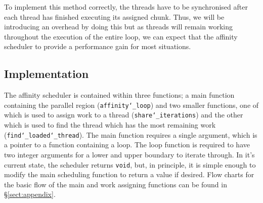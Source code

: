 \documentclass[11pt, a4paper]{article}
\begin{document}
			To implement this method correctly, the threads have to be synchronised after each thread has finished executing its assigned chunk. Thus, we will be introducing an overhead by doing this but as threads will remain working throughout the execution of the entire loop, we can expect that the affinity scheduler to provide a performance gain for most situations.	
			
		\subsection{Implementation}
			The affinity scheduler is contained within three functions; a main function containing the parallel region (\texttt{affinity\char`_loop}) and two smaller functions, one of which is used to assign work to a thread (\texttt{share\char`_iterations}) and the other which is used to find the thread which has the most remaining work (\texttt{find\char`_loaded\char`_thread}). The main function requires a single argument, which is a pointer to a function containing a loop. The loop function is required to have two integer arguments for a lower and upper boundary to iterate through. %
			In it's current state, the scheduler returns \texttt{void}, but, in principle, it is simple enough to modify the main scheduling function to return a value if desired. Flow charts for the basic flow of the main and work assigning functions can be found in \S\ref{sect:appendix}.
			
\end{document}
